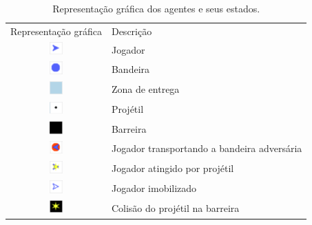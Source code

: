 \documentclass[preprint,12pt]{elsarticle}
\begin{document}
\begin{table}[h!]
	\begin{center}
		\begin{tabular}{ c  p{8cm} }
			\toprule
			Representação gráfica & Descrição \\ 
			\cmidrule(r){1-1}\cmidrule(lr){2-2}
			
			\includegraphics[width=5mm, height=5mm]{figures/player.png}
			& 
			Jogador \\
			
			\includegraphics[width=5mm, height=5mm]{figures/flag.png}
			& 
			Bandeira \\
			
			\includegraphics[width=5mm, height=5mm]{figures/delivery.png}
			& 
			Zona de entrega \\
			
			\includegraphics[width=5mm, height=5mm]{figures/fireshot.png}
			& 
			Projétil \\
			
			\includegraphics[width=5mm, height=5mm]{figures/wall.png}
			& 
			Barreira \\
			
			\includegraphics[width=5mm, height=5mm]{figures/player_with_flag.png}
			& 
			Jogador transportando a bandeira adversária \\
			
			\includegraphics[width=5mm, height=5mm]{figures/fired_player_3.png}
			& 
			Jogador atingido por projétil \\
			
			\includegraphics[width=5mm, height=5mm]{figures/player_stopped.png}
			& 
			Jogador imobilizado \\
			
			\includegraphics[width=5mm, height=5mm]{figures/fired_wall.png}
			& 
			Colisão do projétil na barreira \\
			\bottomrule
		\end{tabular}
		\caption{Representação gráfica dos agentes e seus estados.}
		\label{tbl:graphics}
	\end{center}
\end{table}
\end{document}
